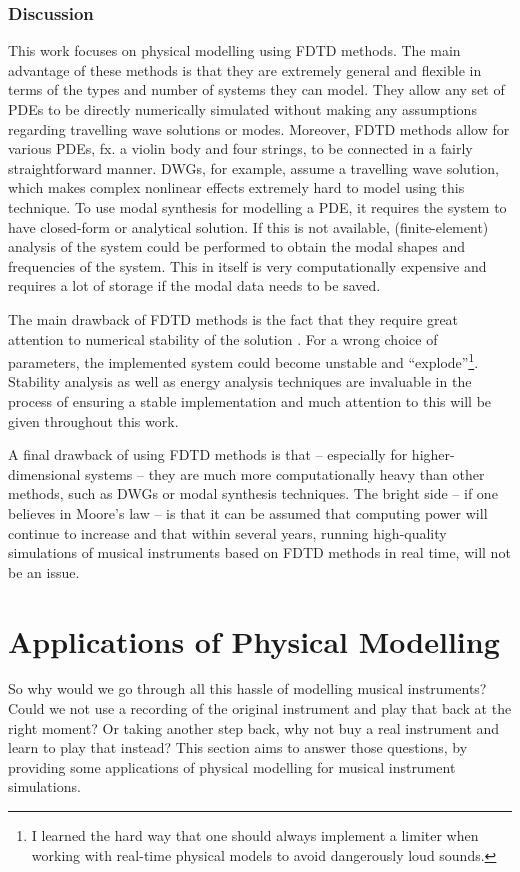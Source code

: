 \subsubsection{Discussion}
This work focuses on physical modelling using FDTD methods. The main advantage of these methods is that they are extremely general and flexible in terms of the types and number of systems they can model. They allow any set of PDEs to be directly numerically simulated without making any assumptions regarding travelling wave solutions or modes. Moreover, FDTD methods allow for various PDEs, fx. a violin body and four strings, to be connected in a fairly straightforward manner. DWGs, for example, assume a travelling wave solution, which makes complex nonlinear effects extremely hard to model using this technique. To use modal synthesis for modelling a PDE, it requires the system to have closed-form or analytical solution. If this is not available, (finite-element) analysis of the system could be performed to obtain the modal shapes and frequencies of the system. This in itself is very computationally expensive and requires a lot of storage if the modal data needs to be saved. 
 
The main drawback of FDTD methods is the fact that they require great attention to numerical stability of the solution \cite{theBible}. For a wrong choice of parameters, the implemented system could become unstable and ``explode''\footnote{I learned the hard way that one should always implement a limiter when working with real-time physical models to avoid dangerously loud sounds.}. Stability analysis as well as energy analysis techniques are invaluable in the process of ensuring a stable implementation and much attention to this will be given throughout this work.

A final drawback of using FDTD methods is that -- especially for higher-dimensional systems -- they are much more computationally heavy than other methods, such as DWGs or modal synthesis techniques. The bright side -- if one believes in Moore's law \cite{Moore1965} -- is that it can be assumed that computing power will continue to increase and that within several years, running high-quality simulations of musical instruments based on FDTD methods in real time, will not be an issue.

\section{Applications of Physical Modelling}\label{sec:why}
So why would we go through all this hassle of modelling musical instruments? Could we not use a recording of the original instrument and play that back at the right moment? Or taking another step back, why not buy a real instrument and learn to play that instead? This section aims to answer those questions, by providing some applications of physical modelling for musical instrument simulations.  

